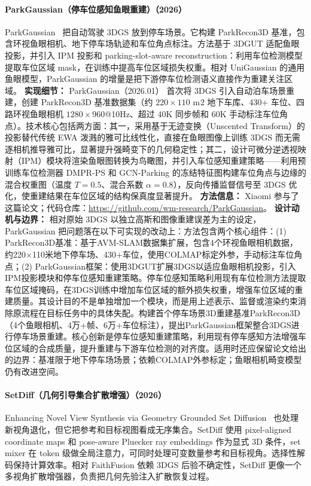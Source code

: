 \paragraph{ParkGaussian（停车位感知鱼眼重建）（2026）}
ParkGaussian~\cite{2601_01386} 把自动驾驶 3DGS 放到停车场景。它构建 ParkRecon3D 基准，包含环视鱼眼相机、地下停车场轨迹和车位角点标注。方法基于 3DGUT 适配鱼眼投影，并引入 IPM 投影和 parking-slot-aware reconstruction：利用车位检测模型提取车位区域 mask，在训练中提高车位区域损失权重。相对 UniGaussian 的通用鱼眼模型，ParkGaussian 的增量是把下游停车位检测语义直接作为重建关注区域。
\textbf{实现细节：} ParkGaussian（2026.01） 首次将 3DGS 引入自动泊车场景重建，创建 ParkRecon3D 基准数据集（约 $220\times110$ m$^{}2$ 地下车库、430+ 车位、四路环视鱼眼相机 $1280\times960$@10Hz、超过 40K 同步帧和 60K 手动标注车位角点）。技术核心包括两方面：其一，采用基于无迹变换（Unscented Transform）的投影替代传统 EWA 泼溅的雅可比线性化，直接在鱼眼图像上训练 3DGS 而无需逐相机推导雅可比，显著提升强畸变下的几何稳定性；其二，设计可微分逆透视映射（IPM）模块将渲染鱼眼图转换为鸟瞰图，并引入车位感知重建策略——利用预训练车位检测器 DMPR-PS 和 GCN-Parking 的冻结特征图构建车位角点与边缘的混合权重图（温度 $T=0.5$、混合系数 $\alpha=0.8$），反向传播监督信号至 3DGS 优化，使重建结果在车位区域的结构保真度显著提升。
\textbf{方法信息：} Xiaomi 参与了这篇论文；代码仓库：\url{https://github.com/wm-research/ParkGaussian}。
\textbf{设计动机与边界：} 相对原始 3DGS 以独立高斯和图像重建误差为主的设定，ParkGaussian 把问题落在以下可实现的改动上：方法包含两个核心组件：(1) ParkRecon3D基准：基于AVM-SLAM数据集扩展，包含4个环视鱼眼相机数据，约220×110米地下停车场、430+车位，使用COLMAP标定外参，手动标注车位角点；(2) ParkGaussian框架：使用3DGUT扩展3DGS以适应鱼眼相机投影，引入IPM投影模块和停车位感知重建策略。停车位感知策略利用现有车位检测方法提取车位区域掩码，在3DGS训练中增加车位区域的额外损失权重，增强车位区域的重建质量。其设计目的不是单独增加一个模块，而是用上述表示、监督或渲染约束消除原流程在目标任务中的具体失配。构建首个停车场景3D重建基准ParkRecon3D（4个鱼眼相机、4万+帧、6万+车位标注），提出ParkGaussian框架整合3DGS进行停车场景重建。核心创新是停车位感知重建策略，利用现有停车感知方法增强车位区域的合成质量，提升重建与下游车位检测的对齐度。适用时还应保留论文给出的边界：基准限于地下停车场场景；依赖COLMAP外参标定；鱼眼相机畸变模型仍有改进空间。
\paragraph{SetDiff（几何引导集合扩散增强）（2026）}
Enhancing Novel View Synthesis via Geometry Grounded Set Diffusion~\cite{2601_07540} 也处理新视角退化，但它把参考和目标视图看成无序集合。SetDiff 使用 pixel-aligned coordinate maps 和 pose-aware Pluecker ray embeddings 作为显式 3D 条件，set mixer 在 token 级做全局注意力，可同时处理可变数量参考和目标视角。选择性解码保持计算效率。相对 FaithFusion 依赖 3DGS 后验不确定性，SetDiff 更像一个多视角扩散增强器，负责把几何先验注入扩散恢复过程。


